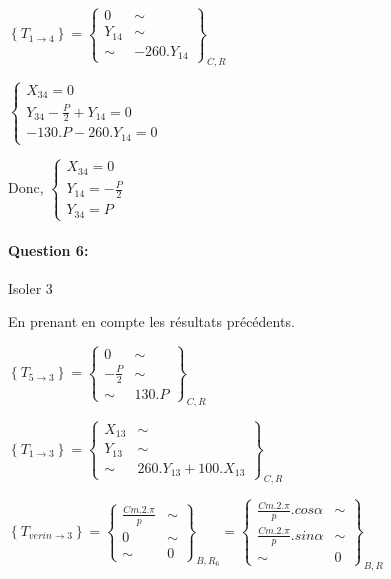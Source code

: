 $\left\{T_{1\rightarrow 4}\right\}=\left\{
\begin{array}{cc}
0 & \sim \\
Y_{14} & \sim \\
\sim & -260.Y_{14}
\end{array}
\right\}_{C,R}$

$\left\{\begin{array}{l}
X_{34}=0 \\
Y_{34}-\frac{P}{2}+Y_{14}=0 \\
-130.P-260.Y_{14}=0
\end{array}\right.$

Donc, $\left\{\begin{array}{l}
X_{34}=0 \\
Y_{14}=-\frac{P}{2} \\
Y_{34}=P
\end{array}\right.$

\paragraph{Question 6:}

Isoler 3

En prenant en compte les résultats précédents.

$\left\{T_{5\rightarrow 3}\right\}=\left\{
\begin{array}{cc}
0 & \sim \\
-\frac{P}{2} & \sim \\
\sim & 130.P
\end{array}
\right\}_{C,R}$

$\left\{T_{1\rightarrow 3}\right\}=\left\{
\begin{array}{cc}
X_{13} & \sim \\
Y_{13} & \sim \\
\sim & 260.Y_{13}+100.X_{13}
\end{array}
\right\}_{C,R}$

$\left\{T_{verin \rightarrow 3}\right\}=\left\{
\begin{array}{cc}
\frac{Cm.2.\pi}{p} & \sim \\
0 & \sim \\
\sim & 0
\end{array}
\right\}_{B,R_6}=\left\{
\begin{array}{cc}
\frac{Cm.2.\pi}{p}.cos\alpha & \sim \\
\frac{Cm.2.\pi}{p}.sin\alpha & \sim \\
\sim & 0
\end{array}
\right\}_{B,R}$

